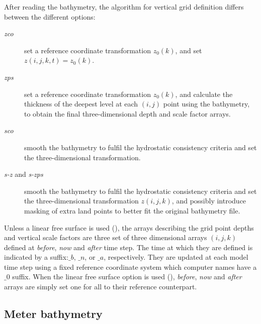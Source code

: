 \documentclass[../main/NEMO_manual]{subfiles}
\begin{document}
After reading the bathymetry, the algorithm for vertical grid definition differs between the different options:
\begin{description}
\item[\textit{zco}]
  set a reference coordinate transformation $z_0 (k)$, and set $z(i,j,k,t)=z_0 (k)$.
\item[\textit{zps}]
  set a reference coordinate transformation $z_0 (k)$,
  and calculate the thickness of the deepest level at each $(i,j)$ point using the bathymetry,
  to obtain the final three-dimensional depth and scale factor arrays.
\item[\textit{sco}]
  smooth the bathymetry to fulfil the hydrostatic consistency criteria and
  set the three-dimensional transformation.
\item[\textit{s-z} and \textit{s-zps}]
  smooth the bathymetry to fulfil the hydrostatic consistency criteria and
  set the three-dimensional transformation $z(i,j,k)$,
  and possibly introduce masking of extra land points to better fit the original bathymetry file.
\end{description}

Unless a linear free surface is used (),
the arrays describing the grid point depths and vertical scale factors are three set of
three dimensional arrays $(i,j,k)$ defined at \textit{before}, \textit{now} and \textit{after} time step.
The time at which they are defined is indicated by a suffix:$\_b$, $\_n$, or $\_a$, respectively.
They are updated at each model time step using a fixed reference coordinate system which
computer names have a $\_0$ suffix.
When the linear free surface option is used (),
\textit{before}, \textit{now} and \textit{after} arrays are simply set one for all to their reference counterpart. 


\subsection{Meter bathymetry}
\label{subsec:DOM_bathy}
\end{document}
